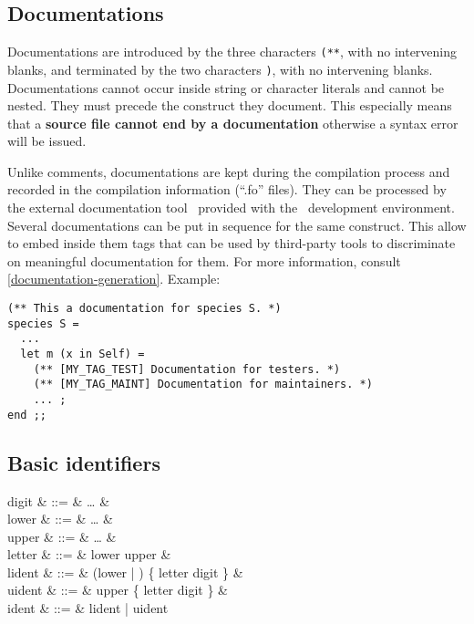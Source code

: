 \subsection{Documentations}
Documentations are introduced by the three characters {\tt (**},
with no intervening blanks, and terminated by the two characters
{\tt *)}, with no intervening blanks.
Documentations cannot occur inside string or character literals and
cannot be nested. They must precede the construct  they document. This
especially means that a
{\bf source file cannot end by a documentation} otherwise a syntax
error will be issued.

Unlike comments, documentations are kept during the compilation process
and recorded in the compilation information (``.fo'' files). They can
be processed by the external documentation tool \focdoc\ provided with
the \focal\ development environment. Several documentations can be put
in sequence for the same construct. This allow to embed inside them
tags that can be used by third-party tools to discriminate on
meaningful documentation for them. For more information, consult
\ref{documentation-generation}.
Example:
{\scriptsize
\begin{lstlisting}
(** This a documentation for species S. *)
species S =
  ...
  let m (x in Self) =
    (** [MY_TAG_TEST] Documentation for testers. *)
    (** [MY_TAG_MAINT] Documentation for maintainers. *)
    ... ;
end ;;
\end{lstlisting}
}



\subsection{Basic identifiers}
\vspace{0.2cm}
\begin{syntax}
digit & ::= & \ldots {} & \\
lower & ::= &  \ldots {} & \\
upper & ::= &  \ldots {} & \\
letter & ::= & lower \mid upper & \\
lident & ::= & (lower | \terminal{\_})
            \{ letter \mid digit \mid \terminal{\_} \} & \\
uident & ::= & upper \{ letter \mid digit \mid \terminal{\_} \} & \\
ident & ::= & lident | uident
\end{syntax}
\vspace{0.2cm}


